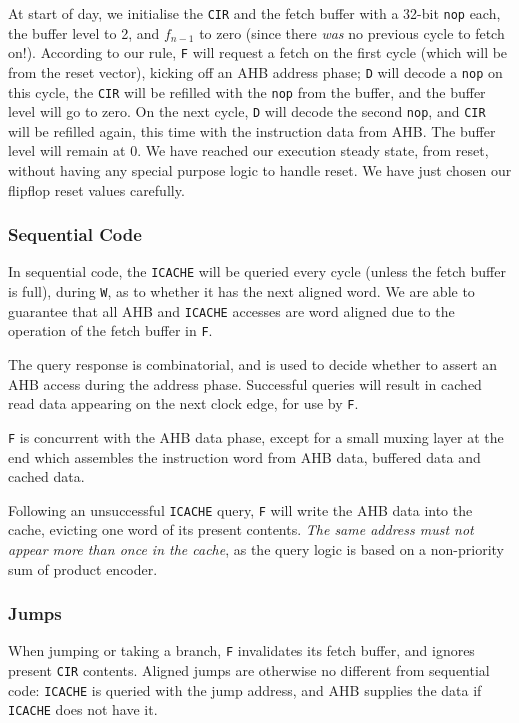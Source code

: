 \documentclass{article}
\begin{document}
At start of day, we initialise the \texttt{CIR} and the fetch buffer with a 32-bit \texttt{nop} each, the buffer level to 2, and $f_{n-1}$ to zero (since there \textit{was} no previous cycle to fetch on!). According to our rule, \texttt{F} will request a fetch on the first cycle (which will be from the reset vector), kicking off an AHB address phase; \texttt{D} will decode a \texttt{nop} on this cycle, the \texttt{CIR} will be refilled with the \texttt{nop} from the buffer, and the buffer level will go to zero. On the next cycle, \texttt{D} will decode the second \texttt{nop}, and \texttt{CIR} will be refilled again, this time with the instruction data from AHB. The buffer level will remain at 0. We have reached our execution steady state, from reset, without having any special purpose logic to handle reset. We have just chosen our flipflop reset values carefully.

\subsubsection{Sequential Code}

In sequential code, the \texttt{ICACHE} will be queried every cycle (unless the fetch buffer is full), during \texttt{W}, as to whether it has the next aligned word. We are able to guarantee that all AHB and \texttt{ICACHE} accesses are word aligned due to the operation of the fetch buffer in \texttt{F}.

The query response is combinatorial, and is used to decide whether to assert an AHB access during the address phase. Successful queries will result in cached read data appearing on the next clock edge, for use by \texttt{F}.

\texttt{F} is concurrent with the AHB data phase, except for a small muxing layer at the end which assembles the instruction word from AHB data, buffered data and cached data.

Following an unsuccessful \texttt{ICACHE} query, \texttt{F} will write the AHB data into the cache, evicting one word of its present contents. \textit{The same address must not appear more than once in the cache}, as the query logic is based on a non-priority sum of product encoder.


\subsubsection{Jumps}
\label{section:jumps}

When jumping or taking a branch, \texttt{F} invalidates its fetch buffer, and ignores present \texttt{CIR} contents. Aligned jumps are otherwise no different from sequential code: \texttt{ICACHE} is queried with the jump address, and AHB supplies the data if \texttt{ICACHE} does not have it.
\end{document}
